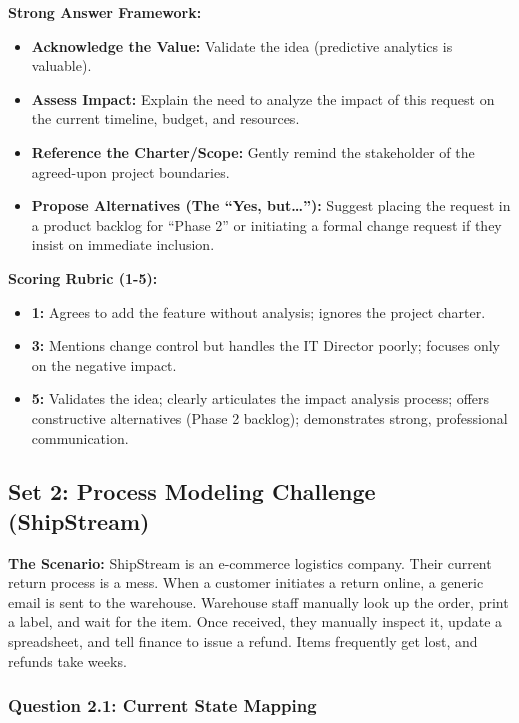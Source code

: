 \textbf{Strong Answer Framework:}

\begin{itemize}
\tightlist
\item
  \textbf{Acknowledge the Value:} Validate the idea (predictive
  analytics is valuable).
\item
  \textbf{Assess Impact:} Explain the need to analyze the impact of this
  request on the current timeline, budget, and resources.
\item
  \textbf{Reference the Charter/Scope:} Gently remind the stakeholder of
  the agreed-upon project boundaries.
\item
  \textbf{Propose Alternatives (The ``Yes, but\ldots{}''):} Suggest
  placing the request in a product backlog for ``Phase 2'' or initiating
  a formal change request if they insist on immediate inclusion.
\end{itemize}

\textbf{Scoring Rubric (1-5):}

\begin{itemize}
\tightlist
\item
  \textbf{1:} Agrees to add the feature without analysis; ignores the
  project charter.
\item
  \textbf{3:} Mentions change control but handles the IT Director
  poorly; focuses only on the negative impact.
\item
  \textbf{5:} Validates the idea; clearly articulates the impact
  analysis process; offers constructive alternatives (Phase 2 backlog);
  demonstrates strong, professional communication.
\end{itemize}

\bigskip

\subsection{Set 2: Process Modeling Challenge
(ShipStream)}\label{set-2-process-modeling-challenge-shipstream}

\textbf{The Scenario:} ShipStream is an e-commerce logistics company.
Their current return process is a mess. When a customer initiates a
return online, a generic email is sent to the warehouse. Warehouse staff
manually look up the order, print a label, and wait for the item. Once
received, they manually inspect it, update a spreadsheet, and tell
finance to issue a refund. Items frequently get lost, and refunds take
weeks.

\subsubsection{Question 2.1: Current State
Mapping}\label{question-2.1-current-state-mapping}

